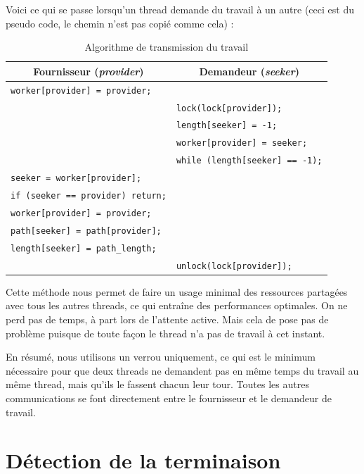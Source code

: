 \documentclass[a4paper,11pt]{report}
\newcommand{\ensp}[1]{\selectlanguage{english}#1\selectlanguage{french}}
\newcommand{\var}[1]{\ensp{\textit{#1}}}
\begin{document}
\bigskip
Voici ce qui se passe lorsqu'un thread demande du travail à un autre (ceci est
du pseudo code, le chemin n'est pas copié comme cela) :

\begin{table}[!htb]
  \centering
  \begin{tabular}{|l||l|}
    \hline
    \multicolumn{1}{|c||}{\textbf{Fournisseur (\var{provider})}} &
    \multicolumn{1}{c|}{\textbf{Demandeur (\var{seeker})}}\\
    \hline\hline
    \verb+worker[provider] = provider;+ &\\
    \hline\hline
    & \verb+lock(lock[provider]);+\\
    & \verb+length[seeker] = -1;+\\
    & \verb+worker[provider] = seeker;+\\
    & \verb+while (length[seeker] == -1);+\\
    \hline
    \verb+seeker = worker[provider];+ &\\
    \verb+if (seeker == provider) return;+ &\\
    \verb+worker[provider] = provider;+ &\\
    \verb+path[seeker] = path[provider];+ &\\
    \verb+length[seeker] = path_length;+ &\\
    \hline
    & \verb+unlock(lock[provider]);+\\
    \hline
  \end{tabular}
  \caption{Algorithme de transmission du travail}
\end{table}

\bigskip
Cette méthode nous permet de faire un usage minimal des ressources partagées
avec tous les autres threads, ce qui entraîne des performances optimales. On
ne perd pas de temps, à part lors de l'attente active. Mais cela de pose pas
de problème puisque de toute façon le thread n'a pas de travail à cet instant.

En résumé, nous utilisons un verrou uniquement, ce qui est le minimum
nécessaire pour que deux threads ne demandent pas en même temps du travail au
même thread, mais qu'ils le fassent chacun leur tour. Toutes les autres
communications se font directement entre le fournisseur et le demandeur de
travail.

\section{Détection de la terminaison}
\end{document}
